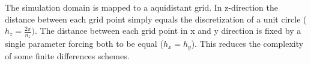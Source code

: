 The simulation domain is mapped to a aquidistant grid. In z-direction the distance between each grid point simply equals the discretization of a unit circle ($h_z= \frac{2\pi}{n_z})$. The distance between each grid point in x and y direction is fixed by a single parameter forcing both to be equal ($h_x = h_y$). This reduces the complexity of some finite differences schemes. 